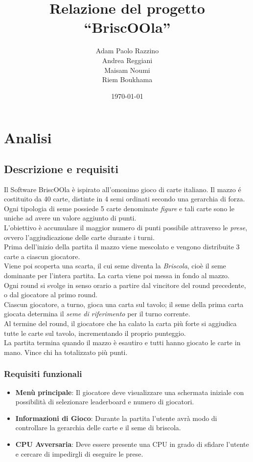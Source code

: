 \documentclass[a4paper,12pt]{report}
\title{Relazione del progetto\\``BriscOOla''}
\author{Adam Paolo Razzino \\ Andrea Reggiani \\ Maisam Noumi \\ Riem Boukhama}
\date{\today}
\begin{document}
\maketitle

\tableofcontents

\chapter{Analisi}

\section{Descrizione e requisiti}

Il Software BriscOOla è ispirato all'omonimo gioco di carte italiano.
Il mazzo é costituito da 40 carte, distinte in 4 semi ordinati secondo una gerarchia di forza. \\
Ogni tipologia di seme possiede 5 carte denominate \emph{figure} e tali carte sono le uniche ad avere un valore aggiunto di punti. \\
L'obiettivo è accumulare il maggior numero di punti possibile attraverso le \emph{prese}, ovvero l'aggiudicazione delle carte durante i turni. \\
Prima dell'inizio della partita il mazzo viene mescolato e vengono distribuite 3 carte a ciascun giocatore.  \\
Viene poi scoperta una scarta, il cui seme diventa la \emph{Briscola}, cioè il seme dominante per l'intera partita. La carta viene poi messa in fondo al mazzo. \\
Ogni round si svolge in senso orario a partire dal vincitore del round precedente, o dal giocatore al primo round. \\
Ciascun giocatore, a turno, gioca una carta sul tavolo; il seme della prima carta giocata determina il \emph{seme di riferimento} per il turno corrente. \\
Al termine del round, il giocatore che ha calato la carta più forte si aggiudica tutte le carte sul tavolo, incrementando il proprio punteggio.  \\
La partita termina quando il mazzo è esautiro e tutti hanno giocato le carte in mano.
Vince chi ha totalizzato più punti.

\subsection*{Requisiti funzionali}
\begin{itemize}
	\item \textbf{Menù principale}: Il giocatore deve visualizzare una schermata iniziale con possibilità di selezionare leaderboard e numero di giocatori.
	\item \textbf{Informazioni di Gioco}: Durante la partita l'utente avrà modo di controllare la gerarchia delle carte e il seme di briscola.
	\item \textbf{CPU Avversaria}: Deve essere presente una CPU in grado di sfidare l'utente e cercare di impedirgli di eseguire le prese.


\end{itemize}
\end{document}
